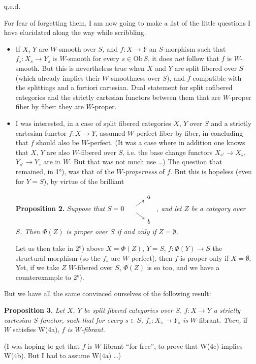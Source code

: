 \hfill q.e.d.

For fear of forgetting them, I am now going to make a list of the little questions I have elucidated along the way while scribbling.

\begin{itemize}[leftmargin=5em,labelsep=0.5em]
\item[1°)] If $X$, $Y$ are $W$-smooth over $S$, and $f : X \longrightarrow Y$ an $S$-morphism such that $f_s : X_s \longrightarrow Y_s$ is $W$-smooth for every $s \in \mathrm{Ob}\,S$, it does \textit{not} follow that $f$ is $W$-smooth. But this is nevertheless true when $X$ and $Y$ are split fibered over $S$ (which
already implies their $W$-smoothness over $S$), and $f$ compatible with the splittings and a fortiori cartesian. Dual statement for split cofibered categories and the strictly cartesian functors between them that are $W$-proper fiber by fiber: they are $W$-proper.

\item[2°)] I was interested, in a case of split fibered categories $X$, $Y$ over $S$ and a strictly cartesian functor $f : X \longrightarrow Y$, assumed $W$-perfect fiber by fiber, in concluding that $f$ should also be $W$-perfect. (It was a case where in addition one knows that $X$, $Y$ are also $W$-fibered over $S$, i.e. the base change functors $X_{s'} \longrightarrow X_s$, $Y_{s'} \longrightarrow Y_s$ are in $W$. But that was not much use \dots) The question that remained, in 1°), was that of the $W$\textit{-properness} of $f$. But this is hopeless (even for $Y = S$), by virtue of the brilliant %

\textbf{Proposition 2.} \textit{Suppose that} $S = 0$
$\begin{tikzcd}[ampersand replacement=\&, row sep=tiny, column sep=small, baseline=(Z.base)]
\& a \\
|[alias=Z]| \phantom{0} \arrow[ur] \arrow[dr] \& \\
\& b
\end{tikzcd}$
\textit{, and let $Z$ be a category over $S$. Then $\Phi(Z)$ is proper over $S$ if and only if $Z = \emptyset$.}

Let us then take in 2°) above $X = \Phi(Z)$, $Y = S$, $f : \Phi(Y) \longrightarrow S$ the structural morphism (so the $f_s$ are $W$-perfect), then $f$ is proper only if $X = \emptyset$. Yet, if we take $Z$ $W$-fibered over $S$, $\Phi(Z)$ is so too, and we have a counterexample to 2°).
\end{itemize}

But we have all the same convinced ourselves of the following result:

\textbf{Proposition 3.} \textit{Let $X$, $Y$ be split fibered categories over $S$, $f : X \longrightarrow Y$ a strictly cartesian $S$-functor, such that}
\textit{for every $s \in S$, $f_s : X_s \longrightarrow Y_s$ is} $W$-fibrant. \textit{Then,} if $W$ satisfies W(4a), $f$ \textit{is $W$-fibrant.}

(I was hoping to get that $f$ is $W$-fibrant ``for free'', to prove that W(4c) implies W(4b). But I had to assume W(4a) \dots)